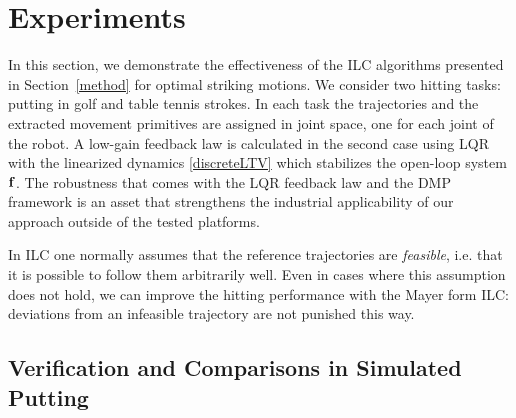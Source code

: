 \section{Experiments}\label{experiments}


In this section, we demonstrate the effectiveness of the ILC algorithms presented in Section~\ref{method} for optimal striking motions. We consider two hitting tasks: putting in golf and table tennis strokes. In each task the trajectories and the extracted movement primitives are assigned in joint space, one for each joint of the robot. A low-gain feedback law is calculated in the second case using LQR with the linearized dynamics \eqref{discreteLTV} which stabilizes the open-loop system $\boldsymbol{\mathrm{f}}$. The robustness that comes with the LQR feedback law and the DMP framework is an asset that strengthens the industrial applicability of our approach outside of the tested platforms.

In ILC one normally assumes that the reference trajectories are \emph{feasible}, i.e. that it is possible to follow them arbitrarily well. Even in cases where this assumption does not hold, we can improve the hitting performance with the Mayer form ILC: deviations from an infeasible trajectory are not punished this way.

\subsection{Verification and Comparisons in Simulated Putting}


